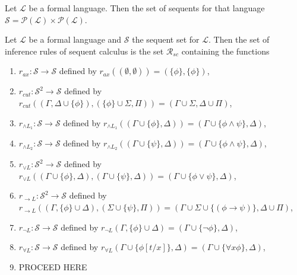\begin{definition}\label{def:sequent-set}
    Let $\mathcal{L}$ be a formal language. Then the set of sequents for that language $\mathcal{S} = \mathcal{P}(\mathcal{L}) \times \mathcal{P}(\mathcal{L})$.
\end{definition}

\begin{definition}\label{def:Rsc}
    Let $\mathcal{L}$ be a formal language and $\mathcal{S}$ the sequent set for $\mathcal{L}$. Then the set of inference rules of sequent calculus is the set $\mathcal{R}_{sc}$ containing the functions
    \begin{enumerate}
        \item $r_{ax} : \mathcal{S} \to \mathcal{S}$ defined by $r_{ax}((\emptyset,\emptyset)) = (\{\phi\},\{\phi\})$,
        \item $r_{cut} : \mathcal{S}^2 \to \mathcal{S}$ defined by $r_{cut}((\Gamma,\Delta \cup \{\phi\}),(\{\phi\} \cup \Sigma,\Pi))=(\Gamma \cup \Sigma, \Delta \cup \Pi)$,
        \item $r_{\land L_1} : \mathcal{S} \to \mathcal{S}$ defined by $r_{\land L_1}((\Gamma \cup \{\phi\}, \Delta))=(\Gamma \cup \{\phi \land \psi\}, \Delta)$,
        \item $r_{\land L_2} : \mathcal{S} \to \mathcal{S}$ defined by $r_{\land L_2}((\Gamma \cup \{\psi\}, \Delta))=(\Gamma \cup \{\phi \land \psi\}, \Delta)$,
        \item $r_{\lor L} : \mathcal{S}^2 \to \mathcal{S}$ defined by $r_{\lor L}((\Gamma \cup \{\phi\},\Delta),(\Gamma \cup \{\psi\},\Delta))=(\Gamma \cup \{\phi \lor \psi\},\Delta)$,
        \item $r_{\to L} : \mathcal{S}^2 \to \mathcal{S}$ defined by $r_{\to L}((\Gamma, \{\phi\} \cup \Delta),(\Sigma \cup \{\psi\},\Pi))=(\Gamma \cup \Sigma \cup \{(\phi \to \psi)\},\Delta \cup \Pi)$,
        \item $r_{\neg L} : \mathcal{S} \to \mathcal{S}$ defined by $r_{\neg L}(\Gamma,\{\phi\} \cup \Delta)=(\Gamma \cup \{\neg \phi\},\Delta)$,
        \item $r_{\forall L} : \mathcal{S} \to \mathcal{S}$ defined by $r_{\forall L}(\Gamma \cup \{\phi [t/x]\},\Delta)=(\Gamma \cup \{ \forall x \phi \},\Delta)$,
        \item PROCEED HERE
    \end{enumerate}
\end{definition}

